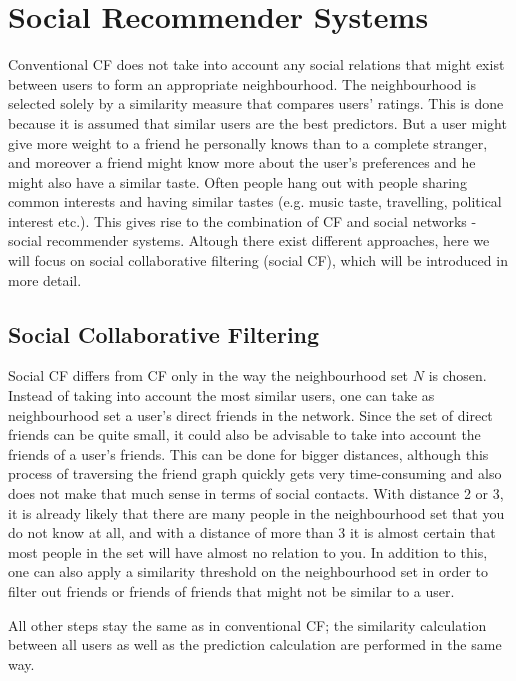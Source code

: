 \section{Social Recommender Systems}
\label{st:socialrecommendersystems} Conventional CF does not take into account any social relations that might exist between users to form an appropriate neighbourhood. The neighbourhood is selected solely by a similarity measure that compares users' ratings. This is done because it is assumed that similar users are the best predictors. But a user might give more weight to a friend he personally knows than to a complete stranger, and moreover a friend might know more about the user's preferences and he might also have a similar taste. Often people hang out with people sharing common interests and having similar tastes (e.g. music taste, travelling, political interest etc.). This gives rise to the combination of CF and social networks - social recommender systems. Altough there exist different approaches, here we will focus on social collaborative filtering (social CF), which will be introduced in more detail.

\subsection{Social Collaborative Filtering}
\label{sst:socialcf} Social CF differs from CF only in the way the neighbourhood set $N$ is chosen. Instead of taking into account the most similar users, one can take as neighbourhood set a user's direct friends in the network. Since the set of direct friends can be quite small, it could also be advisable to take into account the friends of a user's friends. This can be done for bigger distances, although this process of traversing the friend graph quickly gets very time-consuming and also does not make that much sense in terms of social contacts. With distance 2 or 3, it is already likely that there are many people in the neighbourhood set that you do not know at all, and with a distance of more than 3 it is almost certain that most people in the set will have almost no relation to you. In addition to this, one can also apply a similarity threshold on the neighbourhood set in order to filter out friends or friends of friends that might not be similar to a user.

All other steps stay the same as in conventional CF; the similarity calculation between all users as well as the prediction calculation are performed in the same way.